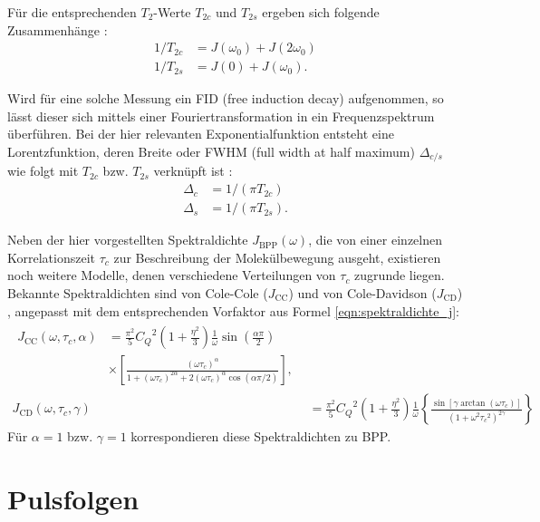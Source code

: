 Für die entsprechenden $T_2$-Werte $T_{2c}$ und $T_{2s}$ ergeben sich folgende Zusammenhänge \cite{eckert}:
\begin{align}
    1/T_{2c} &= J(\omega_0) + J(2\omega_0) \label{eqn:theo:T_2_dyn} \\
    1/T_{2s} &= J(0) + J(\omega_0).
\end{align}

Wird für eine solche Messung ein FID (free induction decay) aufgenommen, so lässt dieser sich mittels einer Fouriertransformation in ein Frequenzspektrum überführen. Bei der hier relevanten Exponentialfunktion entsteht eine Lorentzfunktion, deren Breite oder FWHM (full width at half maximum) $\Delta_{c/s}$ wie folgt mit $T_{2c}$ bzw. $T_{2s}$ verknüpft ist \cite{werbelow}:
\begin{align}
    \Delta_c &= 1/(\pi T_{2c}) \\ \label{eqn:fwhm}
    \Delta_s &= 1/(\pi T_{2s}).
\end{align}

Neben der hier vorgestellten Spektraldichte $J_\text{BPP}(\omega)$, die von einer einzelnen Korrelationszeit $\tau_c$ zur Beschreibung der Molekülbewegung ausgeht, existieren noch weitere Modelle, denen verschiedene Verteilungen von $\tau_c$ zugrunde liegen. Bekannte Spektraldichten sind von Cole-Cole ($J_\text{CC}$) und von Cole-Davidson ($J_\text{CD}$) \cite[S. 105-108]{beckmann_relaxation}, angepasst mit dem entsprechenden Vorfaktor aus Formel \eqref{eqn:spektraldichte_j}:
\begin{align}
\begin{split}
    J_\text{CC}(\omega, \tau_c, \alpha) &= \frac{\pi^2}{5} {C_Q}^2 \left( 1 + \frac{\eta^2}{3} \right) \frac{1}{\omega} \sin \left( \frac{\alpha \pi}{2} \right) \\ &\times \left[ \frac{(\omega \tau_c)^\alpha}{1 + (\omega \tau_c)^{2\alpha} + 2 (\omega \tau_c)^\alpha \cos (\alpha \pi / 2)} \right],
\end{split} \\
    J_\text{CD}(\omega, \tau_c, \gamma) &= \frac{\pi^2}{5} {C_Q}^2 \left( 1 + \frac{\eta^2}{3} \right) \frac{1}{\omega} \left\{ \frac{\sin [\gamma \arctan(\omega \tau_c)]}{(1 + \omega^2 {\tau_c}^2)^{2\gamma}} \right\}
\end{align}
Für $\alpha = 1$ bzw. $\gamma = 1$ korrespondieren diese Spektraldichten zu BPP.





\section{Pulsfolgen} \label{section:theo:pulsfolgen}

